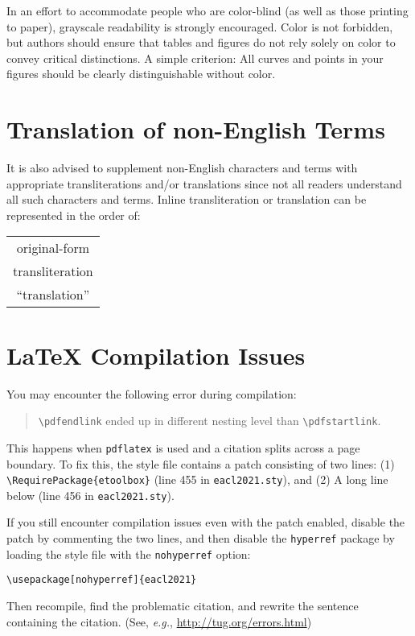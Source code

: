 \documentclass[11pt,a4paper]{article}
\begin{document}
In an effort to accommodate people who are color-blind (as well as those printing to paper), grayscale readability is strongly encouraged.
Color is not forbidden, but authors should ensure that tables and figures do not rely solely on color to convey critical distinctions.
A simple criterion:
All curves and points in your figures should be clearly distinguishable without color.

\section{Translation of non-English Terms}

It is also advised to supplement non-English characters and terms with appropriate transliterations and/or translations since not all readers understand all such characters and terms.
Inline transliteration or translation can be represented in the order of:
\begin{center}
\begin{tabular}{c}
original-form \\
transliteration \\
``translation''
\end{tabular}
\end{center}

\section{\LaTeX{} Compilation Issues}
You may encounter the following error during compilation: 
\begin{quote}
{\small\verb|\pdfendlink|} ended up in different nesting level than {\small\verb|\pdfstartlink|}.
\end{quote}
This happens when \texttt{\small pdflatex} is used and a citation splits across a page boundary.
To fix this, the style file contains a patch consisting of two lines:
(1) {\small\verb|\RequirePackage{etoolbox}|} (line 455 in \texttt{\small eacl2021.sty}), and
(2) A long line below (line 456 in \texttt{\small eacl2021.sty}).

If you still encounter compilation issues even with the patch enabled, disable the patch by commenting the two lines, and then disable the \texttt{\small hyperref} package by loading the style file with the \texttt{\small nohyperref} option:

\noindent
{\small\verb|\usepackage[nohyperref]{eacl2021}|}

\noindent
Then recompile, find the problematic citation, and rewrite the sentence containing the citation. (See, {\em e.g.}, \url{http://tug.org/errors.html})
\end{document}
